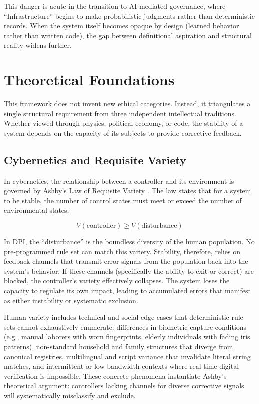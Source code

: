 This danger is acute in the transition to AI-mediated governance, where ``Infrastructure'' begins to make probabilistic judgments rather than deterministic records. When the system itself becomes opaque by design (learned behavior rather than written code), the gap between definitional aspiration and structural reality widens further.

\section{Theoretical Foundations}
\label{sec:theory}

This framework does not invent new ethical categories. Instead, it triangulates a single structural requirement from three independent intellectual traditions. Whether viewed through physics, political economy, or code, the stability of a system depends on the capacity of its subjects to provide corrective feedback.

\subsection{Cybernetics and Requisite Variety}

In cybernetics, the relationship between a controller and its environment is governed by Ashby's Law of Requisite Variety \citep{ashby1956}. The law states that for a system to be stable, the number of control states must meet or exceed the number of environmental states:

\begin{equation}
V(\text{controller}) \geq V(\text{disturbance})
\label{eq:ashby}
\end{equation}

In DPI, the ``disturbance'' is the boundless diversity of the human population. No pre-programmed rule set can match this variety. Stability, therefore, relies on feedback channels that transmit error signals from the population back into the system's behavior. If these channels (specifically the ability to exit or correct) are blocked, the controller's variety effectively collapses. The system loses the capacity to regulate its own impact, leading to accumulated errors that manifest as either instability or systematic exclusion.

Human variety includes technical and social edge cases that deterministic rule sets cannot exhaustively enumerate: differences in biometric capture conditions (e.g., manual laborers with worn fingerprints, elderly individuals with fading iris patterns), non-standard household and family structures that diverge from canonical registries, multilingual and script variance that invalidate literal string matches, and intermittent or low-bandwidth contexts where real-time digital verification is impossible. These concrete phenomena instantiate Ashby's theoretical argument: controllers lacking channels for diverse corrective signals will systematically misclassify and exclude.

